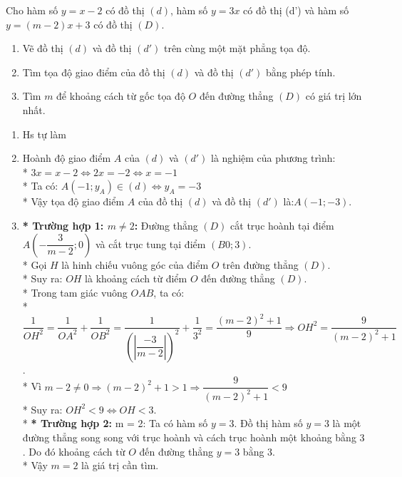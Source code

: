 \begin{ex}
	Cho hàm số $y=x-2$ có đồ thị $(d)$, hàm số $y=3x$ có đồ thị (d') và hàm số $y=(m-2)x+3$ có đồ thị $(D)$.
	\hfill
	\begin{enumerate}
		\item Vẽ đồ thị $(d)$ và đồ thị $(d')$ trên cùng một mặt phẳng tọa độ.
		\item Tìm tọa độ giao điểm của đồ thị $(d)$ và đồ thị $(d')$ bằng phép tính.
		\item Tìm $m$ để khoảng cách từ gốc tọa độ $O$ đến đường thẳng $(D)$ có giá trị lớn nhất.
	\end{enumerate}
	\loigiai
	{
		\begin{enumerate}
			\item Hs tự làm
			\item Hoành độ giao điểm $A$ của $(d)$ và $(d')$ là nghiệm của phương trình:\\*
			$3x=x-2 \Leftrightarrow 2x=-2 \Leftrightarrow x=-1$\\*
			Ta có: $A(-1;y_{A})\in (d) \Leftrightarrow y_{A}=-3$\\*
			Vậy tọa độ giao điểm $A$ của đồ thị $(d)$ và đồ thị $(d')$ là:$A(-1;-3)$.
			\item
			\textbf{* Trường hợp 1: $m\neq 2$:} Đường thẳng $(D)$ cắt trục hoành tại điểm $A\left(-\dfrac{3}{m-2};0\right)$ và cắt trục tung tại điểm $(B0;3)$.\\*
			Gọi $H$ là hinh chiếu vuông góc của điểm $O$ trên đường thẳng $(D)$.\\*
			Suy ra: $OH$ là khoảng cách từ điểm $O$ đến đường thẳng $(D)$.\\*
			Trong tam giác vuông $OAB$, ta có:\\*
			$\dfrac{1}{OH^{2}}=\dfrac{1}{OA^{2}}+\dfrac{1}{OB^{2}}=\dfrac{1}{\left(|\dfrac{-3}{m-2}|\right)^{2}}+\dfrac{1}{3^{2}}=\dfrac{\left(m-2\right)^{2}+1}{9}\Rightarrow OH^{2}=\dfrac{9}{\left(m-2\right)^{2}+1}$.\\*
			Vì $m-2\neq 0 \Rightarrow \left(m-2\right)^{2}+1>1 \Rightarrow \dfrac{9}{\left(m-2\right)^{2}+1}<9$\\*
			Suy ra: $OH^{2}<9\Leftrightarrow OH<3$.\\*
			\textbf{* Trường hợp 2:} m = 2: Ta có hàm số $y=3$. Đồ thị hàm số $y=3$ là một đường thẳng song song với trục hoành và cách trục hoành một khoảng bằng $3$. Do đó khoảng cách từ $O$ đến đường thẳng $y=3$ bằng $3$.\\*
			Vậy $m=2$ là giá trị cần tìm.
		\end{enumerate}
	}
\end{ex}
